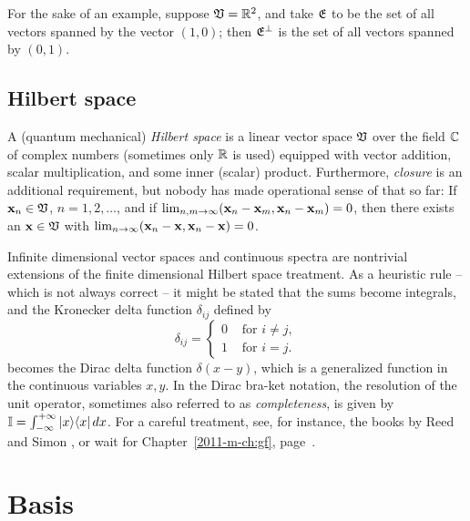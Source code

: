 {
\color{blue}
\bexample
For the sake of an example, suppose ${\frak V}={\Bbb R}^2$,
and take ${\frak E}$ to be the set of all vectors spanned by the vector $(1,0)$;
then ${\frak E}^\perp$ is the set of all vectors spanned by $(0,1)$.
\eexample
}


\subsection{Hilbert space}


A (quantum mechanical) {\em Hilbert space}  is a linear
vector space ${\frak V}$ over the field ${\Bbb C}$ of complex numbers
(sometimes only ${\Bbb R}$ is used)
equipped with vector addition, scalar multiplication, and some inner (scalar) product.
Furthermore, {\em closure} is an additional requirement,
but nobody has made operational sense of that so far:
If ${\bf x}_n\in {\frak V}$, $n=1,2,\ldots$, and if $\lim_{n,m\rightarrow
\infty} ({\bf x}_n-{\bf x}_m,{\bf x}_n-{\bf x}_m)=0$,
then there exists an ${\bf x}\in {\frak V}$ with
$\lim_{n\rightarrow \infty} ({\bf x}_n-{\bf x},{\bf x}_n-{\bf x})=0$.





Infinite dimensional vector spaces and continuous spectra are nontrivial
extensions of the finite
dimensional Hilbert space treatment. As a heuristic rule -- which is not
always correct -- it might be
stated that the sums become integrals, and the Kronecker delta function
$\delta_{ij}$ defined by
\begin{equation}
\delta_{ij} =\begin{cases}
0  &\text{ for }i\neq j , \\
1  &\text{ for }i = j.
\end{cases}
\end{equation}
becomes the Dirac delta function $\delta (x-y)$, which is a
generalized function in the continuous variables $x,y$.
In the Dirac bra-ket notation, the resolution of the unit operator,
sometimes also referred to as {\em completeness}, is given by
${\Bbb I} = \int_{-\infty}^{+\infty} \vert x\rangle \langle  x\vert \, dx$.
For a careful treatment, see, for instance,
the books by
Reed and Simon \cite{reed-sim1,reed-sim2},
or wait for Chapter~\ref{2011-m-ch:gf}, page~\pageref{2011-m-ch:gf}.


\section{Basis}
\label{2012-m-ch-fdvs-Basis}

